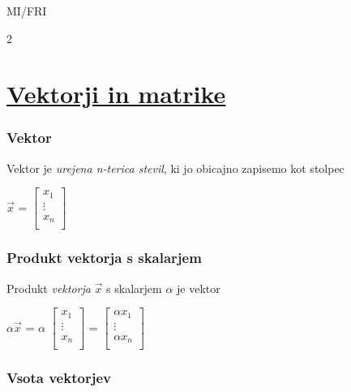 \documentclass{article}
\begin{document}
\begin{center}
	{\small MI/FRI \par}
\end{center}

\begin{multicols}{2}

	\section{\underline{Vektorji in matrike}}

	\subsubsection{Vektor}

	Vektor je \textit{urejena n-terica stevil}, ki jo obicajno
	zapisemo kot stolpec\smallskip
	\begin{center}
		$\vec{x}$ =
		$\begin{bmatrix}
				x_{1}  \\
				\vdots \\
				x_{n}  \\
			\end{bmatrix}$
	\end{center}

	\subsubsection{Produkt vektorja s skalarjem}

	Produkt \textit{vektorja} $\vec{x}$ s skalarjem $\alpha$ je vektor
	\begin{center}
		$\alpha \vec{x}$ =
		$\alpha$
		$\begin{bmatrix}
				x_{1}  \\
				\vdots \\
				x_{n}  \\
			\end{bmatrix}$ =
		$\begin{bmatrix}
				\alpha x_{1} \\
				\vdots       \\
				\alpha x_{n} \\
			\end{bmatrix}$
	\end{center}

	\subsubsection{Vsota vektorjev}


\end{multicols}
\end{document}
